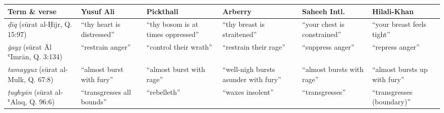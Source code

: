 \begin{longtable}[]{@{}
  >{\centering\arraybackslash}p{}
  >{\raggedright\arraybackslash}p{}
  >{\raggedright\arraybackslash}p{}
  >{\raggedright\arraybackslash}p{}
  >{\raggedright\arraybackslash}p{}
  >{\raggedright\arraybackslash}p{}@{}}
\toprule\noalign{}
\begin{minipage}[b]{\linewidth}\centering
Term \& verse
\end{minipage} & \begin{minipage}[b]{\linewidth}\raggedright
Yusuf Ali
\end{minipage} & \begin{minipage}[b]{\linewidth}\raggedright
Pickthall
\end{minipage} & \begin{minipage}[b]{\linewidth}\raggedright
Arberry
\end{minipage} & \begin{minipage}[b]{\linewidth}\raggedright
Saheeh Intl.
\end{minipage} & \begin{minipage}[b]{\linewidth}\raggedright
Hilali-Khan
\end{minipage} \\
\midrule\noalign{}
\endhead
\bottomrule\noalign{}
\endlastfoot
\emph{ḍīq} (sūrat al-Ḥijr, Q. 15:97) & ``thy heart is distressed'' &
``thy bosom is at times oppressed'' & ``thy breast is straitened'' &
``your chest is constrained'' & ``your breast feels tight'' \\
\emph{ġayẓ} (sūrat Āl ʿImrān, Q. 3:134) & ``restrain anger'' & ``control
their wrath'' & ``restrain their rage'' & ``suppress anger'' & ``repress
anger'' \\
\emph{tamayyuz} (sūrat al-Mulk, Q. 67:8) & ``almost burst with fury'' &
``almost burst with rage'' & ``well-nigh bursts asunder with fury'' &
``almost bursts with rage'' & ``almost bursts up with fury'' \\
\emph{ṭughyān} (sūrat al-ʿAlaq, Q. 96:6) & ``transgresses all bounds'' &
``rebelleth'' & ``waxes insolent'' & ``transgresses'' & ``transgresses
(boundary)'' \\
\end{longtable}

